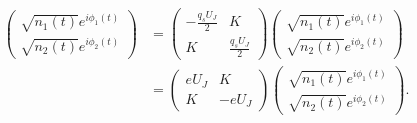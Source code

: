 \documentclass{report}
\numberwithin{tm}{section}
\begin{document}
\begin{align}
\begin{aligned}
\begin{pmatrix}
	\sqrt{n_1(t)}e^{i\phi_1(t)} \\ \sqrt{n_2(t)}e^{i\phi_2(t)}
\end{pmatrix} &= \begin{pmatrix}
	-\tfrac{q_sU_J}{2} & K \\
	K & \tfrac{q_sU_J}{2}
\end{pmatrix}\begin{pmatrix}
	\sqrt{n_1(t)}e^{i\phi_1(t)} \\ \sqrt{n_2(t)}e^{i\phi_2(t)}
\end{pmatrix}\\
 &= \begin{pmatrix}
 	eU_J & K \\
 	K & -eU_J
 \end{pmatrix}\begin{pmatrix}
 	\sqrt{n_1(t)}e^{i\phi_1(t)} \\ \sqrt{n_2(t)}e^{i\phi_2(t)}
 \end{pmatrix}.
\end{aligned}\end{align}
\end{document}
